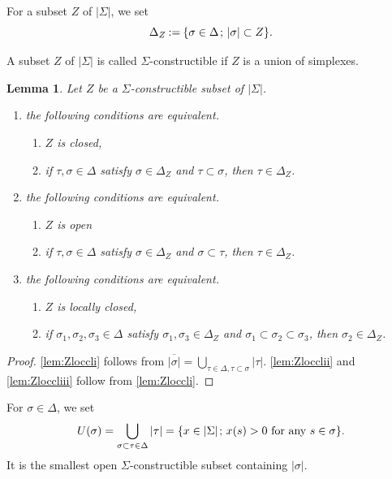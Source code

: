 \documentclass[11pt]{article}
\numberwithin{equation}{section}
\newenvironment{enumeratei}
{\bgroup\def\theenumi{\roman{enumi}}\def\theenumii{\alph{enumii}}\begin{enumerate}}
{\end{enumerate}\egroup}
\let\ol\overline
\newcommand{\semicolon}{\nobreak \mskip2mu\mathpunct{}\nonscript\mkern-\thinmuskip{;}\mskip6mu plus1mu\relax}
\newcommand{\set}[2]{{\left\{#1\semicolon #2 \right\}}}
\theoremstyle{plain}
\newtheorem{lemma}[theorem]{Lemma}
\theoremstyle{definition}
\newcommand{\st}[1]{{\{{#1}\}}}
\begin{document}
For a subset $Z$ of $|\Sigma|$,
we set \[\Delta_Z\seteq\set{\sigma\in \Delta}{|\sigma|\subset Z}.\]

A subset $Z$ of $|\Sigma|$ is called $\Sigma$-constructible if
$Z$ is a union of simplexes.

\begin{lemma}\label{lem:Zloccl}
Let $Z$ be a $\Sigma$-constructible subset of $|\Sigma|$.
\begin{enumeratei}
\item\label{lem:Zloccli} the following conditions are equivalent.
\begin{enumerate}
\item\label{lem:Zlocclia} $Z$ is closed,
\item\label{lem:Zlocclib}
if $\tau, \sigma\in\Delta$ satisfy
$\sigma\in\Delta_Z$ and $\tau\subset \sigma$, then
$\tau\in \Delta_Z$.
\end{enumerate}
\item\label{lem:Zlocclii} the following conditions are equivalent.
\begin{enumerate}
\item\label{lem:Zloccliia} $Z$ is open
\item\label{lem:Zloccliib}
if $\tau, \sigma\in\Delta$ satisfy
$\sigma\in\Delta_Z$ and $\sigma\subset \tau$, then
$\tau\in \Delta_Z$.
\end{enumerate}
\item\label{lem:Zloccliii} the following conditions are equivalent.
\begin{enumerate}
\item\label{lem:Zloccliiia} $Z$ is locally closed,
\item\label{lem:Zloccliiib}
if $\sigma_1, \sigma_2,\sigma_3\in\Delta$ satisfy
$\sigma_1,\sigma_3\in\Delta_Z$ and $\sigma_1\subset \sigma_2\subset \sigma_3$,
then
$\sigma_2\in \Delta_Z$.
\end{enumerate}
\end{enumeratei}
\end{lemma}

\begin{proof}
\eqref{lem:Zloccli} follows from $\ol{|\sigma|}=\bigcup_{\tau\in\Delta,\tau\subset\sigma}|\tau|$.
\eqref{lem:Zlocclii} and \eqref{lem:Zloccliii} follow from \eqref{lem:Zloccli}.
\end{proof}

For $\sigma\in\Delta$, we set
\[U(\sigma)=\bigcup_{\sigma\subset \tau\in\Delta}|\tau| = \st{x\in|\Sigma|\semicolon x(s)>0\text{ for any } s\in\sigma}.\]
It is the smallest open $\Sigma$-constructible subset containing $|\sigma|$.
\end{document}

